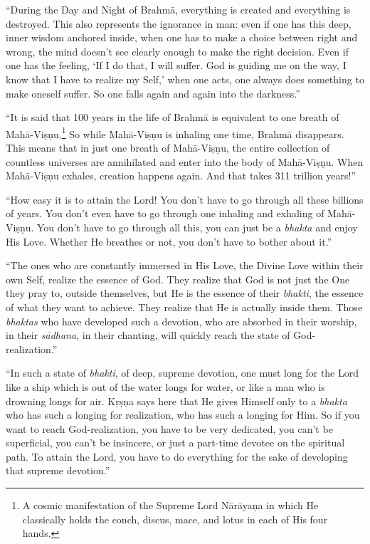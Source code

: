 \enquote{During the Day and Night of Brahmā, everything is created and everything is destroyed. This also represents the ignorance in man: even if one has this deep, inner wisdom anchored inside, when one has to make a choice between right and wrong, the mind doesn’t see clearly enough to make the right decision. Even if one has the feeling, \enquote{If I do that, I will suffer. God is guiding me on the way, I know that I have to realize my Self,} when one acts, one always does something to make oneself suffer. So one falls again and again into the darkness.}

\enquote{It is said that 100 years in the life of Brahmā is equivalent to one breath of Mahā-Viṣṇu.\footnote{A cosmic manifestation of the Supreme Lord Nārāyaṇa in which He classically holds the conch, discus, mace, and lotus in each of His four hands.} So while Mahā-Viṣṇu is inhaling one time, Brahmā disappears. This means that in just one breath of Mahā-Viṣṇu, the entire collection of countless universes are annihilated and enter into the body of Mahā-Viṣṇu. When Mahā-Viṣṇu exhales, creation happens again. And that takes 311 trillion years!}

\enquote{How easy it is to attain the Lord! You don’t have to go through all these billions of years. You don’t even have to go through one inhaling and exhaling of Mahā-Viṣṇu. You don’t have to go through all this, you can just be a \textit{bhakta} and enjoy His Love. Whether He breathes or not, you don’t have to bother about it.}

\enquote{The ones who are constantly immersed in His Love, the Divine Love within their own Self, realize the essence of God. They realize that God is not just the One they pray to, outside themselves, but He is the essence of their \textit{bhakti}, the essence of what they want to achieve. They realize that He is actually inside them. Those \textit{bhaktas} who have developed such a devotion, who are absorbed in their worship, in their \textit{sādhana}, in their chanting, will quickly reach the state of God-realization.}

\enquote{In such a state of \textit{bhakti}, of deep, supreme devotion, one must long for the Lord like a ship which is out of the water longs for water, or like a man who is drowning longs for air. Kṛṣṇa says here that He gives Himself only to a \textit{bhakta} who has such a longing for realization, who has such a longing for Him. So if you want to reach God-realization, you have to be very dedicated, you can’t be superficial, you can’t be insincere, or just a part-time devotee on the spiritual path. To attain the Lord, you have to do everything for the sake of developing that supreme devotion.}

